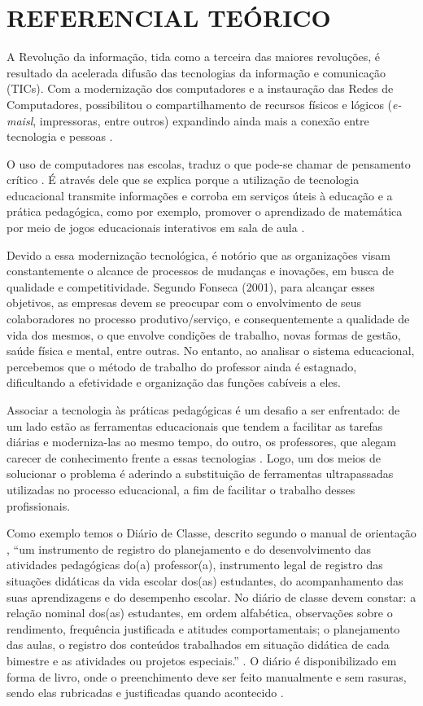\chapter{REFERENCIAL TEÓRICO}
\label{cap:referencial}

A Revolução da informação, tida como a terceira das maiores revoluções, é resultado da acelerada difusão das tecnologias da informação e comunicação (TICs). Com a modernização dos computadores e a instauração das Redes de Computadores, possibilitou o compartilhamento de recursos físicos e lógicos (\textit{e-maisl}, impressoras, entre outros) expandindo ainda mais a conexão entre tecnologia e pessoas \cite{helmano1995}.


O uso de computadores nas escolas, traduz o que pode-se chamar de pensamento crítico \cite{valente1993}. É através dele que se explica porque a utilização de tecnologia educacional transmite informações e corroba em serviços úteis à educação e a prática pedagógica, como por exemplo, promover o aprendizado de matemática por meio de jogos educacionais interativos em sala de aula \cite{seabra1993}.

Devido a essa modernização tecnológica, é notório que as organizações visam constantemente o alcance de processos de mudanças e inovações, em busca de qualidade e competitividade. Segundo Fonseca (2001), para alcançar esses objetivos, as empresas devem se preocupar com o envolvimento de seus colaboradores no processo produtivo/serviço, e consequentemente a qualidade de vida dos mesmos, o que envolve condições de trabalho, novas formas de gestão, saúde física e mental, entre outras. No entanto, ao analisar o sistema educacional, percebemos que o método de trabalho do professor ainda é estagnado, dificultando a efetividade e organização das funções cabíveis a eles.


Associar a tecnologia às práticas pedagógicas é um desafio a ser enfrentado: de um lado estão as ferramentas educacionais que tendem a facilitar as tarefas diárias e moderniza-las ao mesmo tempo, do outro, os professores, que alegam carecer de conhecimento frente a essas tecnologias \cite{REP's1158}. Logo, um dos meios de solucionar o problema é aderindo a substituição de ferramentas ultrapassadas utilizadas no processo educacional, a fim de facilitar o trabalho desses profissionais.

Como exemplo temos o Diário de Classe, descrito segundo o manual de orientação \cite{manualDiario} , “um instrumento de registro do planejamento e do desenvolvimento das atividades pedagógicas do(a) professor(a), instrumento legal de registro das situações didáticas da vida escolar dos(as) estudantes, do acompanhamento das suas aprendizagens e do desempenho escolar. No diário de classe devem constar: a relação nominal dos(as) estudantes, em ordem alfabética, observações sobre o rendimento, frequência justificada e atitudes comportamentais; o planejamento das aulas, o registro dos conteúdos trabalhados em situação didática de cada bimestre e as atividades ou projetos especiais.” . O diário é disponibilizado em forma de livro, onde o preenchimento deve ser feito manualmente e sem rasuras, sendo elas rubricadas e justificadas quando acontecido \cite{teresa1999manual}.


